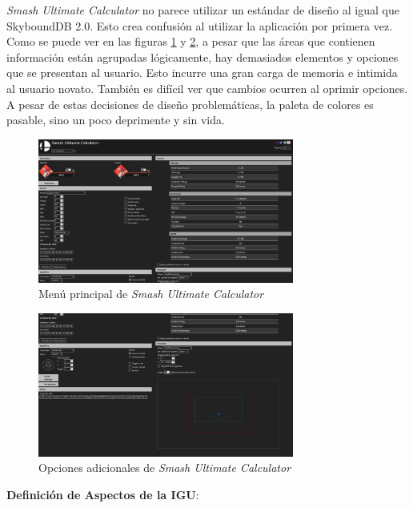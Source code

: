 \newpage

\textit{Smash Ultimate Calculator} no parece utilizar un estándar de diseño al igual que SkyboundDB 2.0. Esto crea confusión al utilizar la aplicación por primera vez. Como se puede ver en las figuras \ref{fig: SUC main menu} y \ref{fig: SUC additional options}, a pesar que las áreas que contienen información están agrupadas lógicamente, hay demasiados elementos y opciones que se presentan al usuario. Esto incurre una gran carga de memoria e intimida al usuario novato. También es difícil ver que cambios ocurren al oprimir opciones. A pesar de estas decisiones de diseño problemáticas, la paleta de colores es pasable, sino un poco deprimente y sin vida.

\begin{figure}[ht!]
    \centering
    \includegraphics[width=0.75\textwidth]{figures/SUC1.png}
    \caption{Menú principal de \textit{Smash Ultimate Calculator}}
    \label{fig: SUC main menu}
\end{figure}

\begin{figure}[ht!]
    \centering
    \includegraphics[width=0.75\textwidth]{figures/SUC2.png}
    \caption{Opciones adicionales de \textit{Smash Ultimate Calculator}}
    \label{fig: SUC additional options}
\end{figure}

\newpage

\textbf{Definición de Aspectos de la IGU}: 

